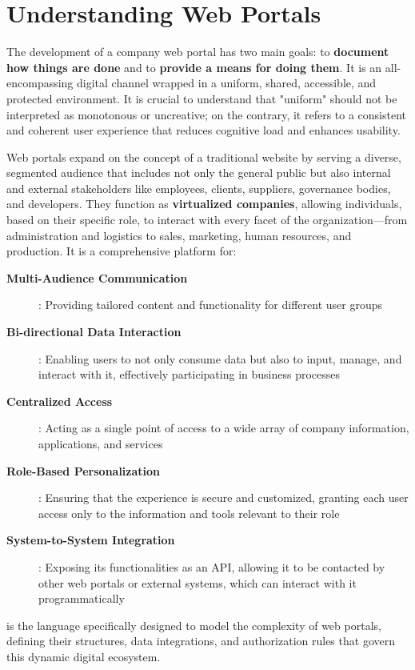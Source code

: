 \section{Understanding Web Portals}
\label{sec:web-portals}

The development of a company web portal has two main goals: to \textbf{document how things are done} and to \textbf{provide a means for doing them}. It is an all-encompassing digital channel wrapped in a uniform, shared, accessible, and protected environment. It is crucial to understand that "uniform" should not be interpreted as monotonous or uncreative; on the contrary, it refers to a consistent and coherent user experience that reduces cognitive load and enhances usability.

Web portals expand on the concept of a traditional website by serving a diverse, segmented audience that includes not only the general public but also internal and external stakeholders like employees, clients, suppliers, governance bodies, and developers. They function as \textbf{virtualized companies}, allowing individuals, based on their specific role, to interact with every facet of the organization—from administration and logistics to sales, marketing, human resources, and production. It is a comprehensive platform for:

\begin{description}
\item[\textbf{Multi-Audience Communication}]: Providing tailored content and functionality for different user groups
\item[\textbf{Bi-directional Data Interaction}]: Enabling users to not only consume data but also to input, manage, and interact with it, effectively participating in business processes
\item[\textbf{Centralized Access}]: Acting as a single point of access to a wide array of company information, applications, and services
\item[\textbf{Role-Based Personalization}]: Ensuring that the experience is secure and customized, granting each user access only to the information and tools relevant to their role
\item[\textbf{System-to-System Integration}]: Exposing its functionalities as an API, allowing it to be contacted by other web portals or external systems, which can interact with it programmatically
\end{description}

\wbdl{} is the language specifically designed to model the complexity of web portals, defining their structures, data integrations, and authorization rules that govern this dynamic digital ecosystem.

